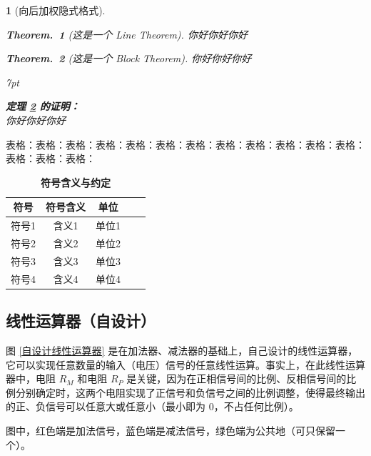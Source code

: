\documentclass[a4paper]{article}  %
\newenvironment{graybox}{%
\def\FrameCommand{%
\hspace{1pt}%
{\color{gray}\small \vrule width 2pt}%
{\color{graybox_color}\vrule width 4pt}%
\colorbox{graybox_color}%
}%
\MakeFramed{\advance\hsize-\width\FrameRestore}%
\noindent\hspace{-4.55pt}%
\begin{adjustwidth}{}{7pt}%
\vspace{2pt}\vspace{2pt}%
}
{%
\vspace{2pt}\end{adjustwidth}\endMakeFramed%
}
\theoremstyle{MyLineTheoremStyle} %
\newtheorem{LineTheorem}{Theorem.\,}
\theoremstyle{MyBlockTheoremStyle} %
\newtheorem{BlockTheorem}[LineTheorem]{Theorem.\,} %
\theoremstyle{MySubsubsectionStyle} %
\newtheorem{definition}{}
\renewcommand{\small}{\fontsize{5pt}{3.5pt}\selectfont}
\begin{document}
\begin{multicols*}{4}
\begin{definition}[向后加权隐式格式]
\begin{LineTheorem}[这是一个 Line Theorem]\label{这是一个 Line Theorem}
你好你好你好
\end{LineTheorem}

\begin{BlockTheorem}[这是一个 Block Theorem]\label{这是一个 Block Theorem}
你好你好你好
\end{BlockTheorem}



\begin{graybox}
\textbf{定理 \ref{这是一个 Block Theorem} 的证明：}\\
你好你好你好
\end{graybox}


\end{definition}

表格：表格：表格：表格：表格：表格：表格：表格：表格：表格：表格：表格：表格：表格：表格：

\begin{table}[H]
\centering
\caption{\textbf{符号含义与约定}}
\label{tab:waterpump}
\begin{tabular}{ccccc}
\toprule
符号 & 符号含义& 单位\\
\midrule
符号1& 含义1& 单位1\\
符号2& 含义2& 单位2\\
符号3& 含义3& 单位3\\
符号4& 含义4& 单位4\\
\bottomrule
\end{tabular}
\end{table}

\subsection{线性运算器（自设计）}
图 \ref{自设计线性运算器} 是在加法器、减法器的基础上，自己设计的线性运算器，它可以实现任意数量的输入（电压）信号的任意线性运算。事实上，在此线性运算器中，电阻 $R_M$ 和电阻 $R_P$ 是关键，因为在正相信号间的比例、反相信号间的比例分别确定时，这两个电阻实现了正信号和负信号之间的比例调整，使得最终输出的正、负信号可以任意大或任意小（最小即为 0，不占任何比例）。

图中，红色端是加法信号，蓝色端是减法信号，绿色端为公共地（可只保留一个）。

\setlength{\floatsep}{12pt plus 2pt minus 2pt} %
\setlength{\textfloatsep}{18pt plus 2pt minus 4pt} %
\setlength{\intextsep}{12pt plus 2pt minus 2pt} %


\end{multicols*}
\end{document}
